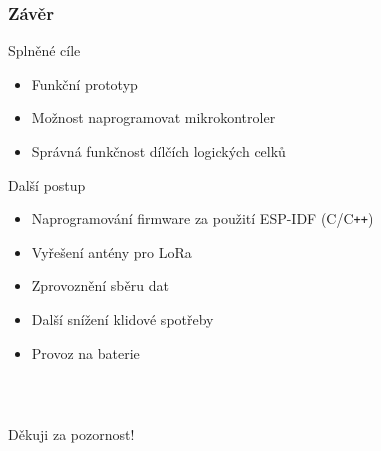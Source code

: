 \documentclass[%
  12pt,       				%
	t,                  %
	aspectratio=1610,   %
	unicode,						%
]{beamer}				    	%
\begin{document}
\begin{frame} 
	\frametitle{Závěr}
	Splněné cíle
	\begin{itemize}
		\item Funkční prototyp
		\item Možnost naprogramovat mikrokontroler
		\item Správná funkčnost dílčích logických celků
	\end{itemize}
	Další postup
	\begin{itemize}
		\item Naprogramování firmware za použití ESP-IDF (C/C\texttt{++})
		\item Vyřešení antény pro LoRa
		\item Zprovoznění sběru dat
		\item Další snížení klidové spotřeby
		\item Provoz na baterie
	\end{itemize}
\end{frame}


\begin{frame}[c] 
	\frametitle{\mbox{ }}
	\begin{center}
		{\Huge Děkuji za pozornost!}
	\end{center}
\end{frame}

\end{document}
